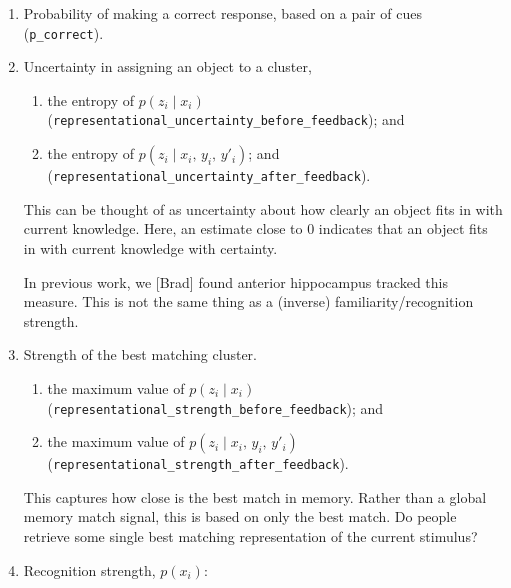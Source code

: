 \documentclass[11pt,a4paper]{article}
\begin{document}
\begin{enumerate}

    \item Probability of making a correct response, based on a pair of cues (\texttt{p\_correct}).

    \item Uncertainty in assigning an object to a cluster,
    \begin{enumerate}

        \item the entropy of $p(z_{i} \;\vert\; x_{i})$
            (\texttt{representational\_uncertainty\_before\_feedback}); and

        \item the entropy of $p(z_{i} \;\vert\; x_{i}, \, y_{i},\, y'_{i})$; and
            (\texttt{representational\_uncertainty\_after\_feedback}).

    \end{enumerate}

        This can be thought of as uncertainty about how clearly an object fits in with current
        knowledge. Here, an estimate close to $0$ indicates that an object fits in with current
        knowledge with certainty.

        In previous work, we [Brad] found anterior hippocampus tracked this measure. This
        is not the same thing as a (inverse) familiarity/recognition strength.

    \item Strength of the best matching cluster.
    \begin{enumerate}

        \item the maximum value of $p(z_{i} \;\vert\; x_{i})$
            (\texttt{representational\_strength\_before\_feedback}); and

        \item the maximum value of $p(z_{i} \;\vert\; x_{i}, \, y_{i},\, y'_{i})$
            (\texttt{representational\_strength\_after\_feedback}).

    \end{enumerate}

        This captures how close is the best match in memory. Rather than a global memory match
        signal, this is based on only the best match. Do people retrieve some single best matching
        representation of the current stimulus?

    \item Recognition strength, $p(x_{i})$:


\end{enumerate}
\end{document}
